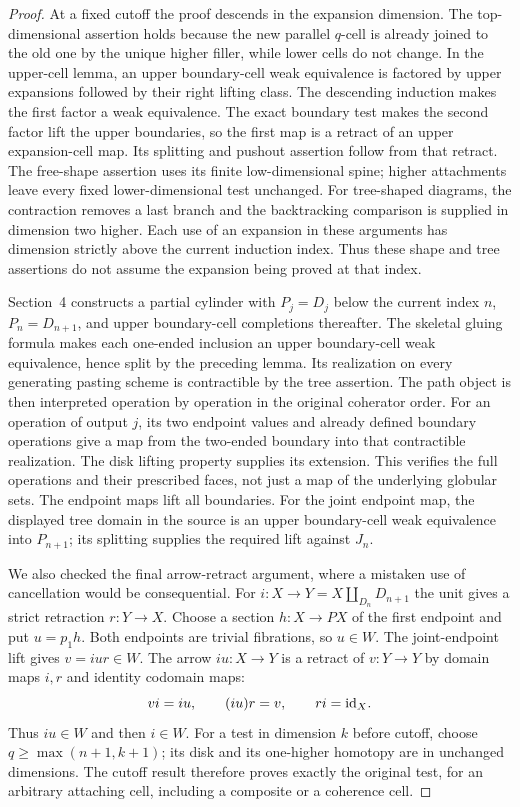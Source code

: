 \begin{proof}
At a fixed cutoff the proof descends in the expansion dimension.
The top-dimensional assertion holds because the new parallel
$q$-cell is already joined to the old one by the unique higher
filler, while lower cells do not change. In the upper-cell lemma,
an upper boundary-cell weak equivalence is factored by upper
expansions followed by their right lifting class. The descending
induction makes the first factor a weak equivalence. The exact
boundary test makes the second factor lift the upper boundaries,
so the first map is a retract of an upper expansion-cell map.
Its splitting and pushout assertion follow from that retract.
The free-shape assertion uses its finite low-dimensional spine;
higher attachments leave every fixed lower-dimensional test
unchanged. For tree-shaped diagrams, the contraction removes a
last branch and the backtracking comparison is supplied in
dimension two higher. Each use of an expansion in these arguments
has dimension strictly above the current induction index. Thus
these shape and tree assertions do not assume the expansion being
proved at that index.

Section~4 constructs a partial cylinder with $P_j=D_j$ below the
current index $n$, $P_n=D_{n+1}$, and upper boundary-cell completions
thereafter. The skeletal gluing formula makes each one-ended
inclusion an upper boundary-cell weak equivalence, hence split by
the preceding lemma. Its realization on every generating pasting
scheme is contractible by the tree assertion. The path object is
then interpreted operation by operation in the original coherator
order. For an operation of output $j$, its two endpoint values and
already defined boundary operations give a map from the
two-ended boundary into that contractible realization. The disk
lifting property supplies its extension. This verifies the full
operations and their prescribed faces, not just a map of the
underlying globular sets. The endpoint maps lift all boundaries.
For the joint endpoint map, the displayed tree domain in the
source is an upper boundary-cell weak equivalence into $P_{n+1}$;
its splitting supplies the required lift against $J_n$.

We also checked the final arrow-retract argument, where a mistaken
use of cancellation would be consequential. For
$i:X\to Y=X\amalg_{D_n}D_{n+1}$ the unit gives a strict
retraction $r:Y\to X$. Choose a section $h:X\to PX$ of the
first endpoint and put $u=p_1h$. Both endpoints are trivial
fibrations, so $u\in W$. The joint-endpoint lift gives
$v=iur\in W$. The arrow $iu:X\to Y$ is a retract of
$v:Y\to Y$ by domain maps $i,r$ and identity codomain maps:
\[
 vi=iu,\qquad (iu)r=v,\qquad ri=\mathrm{id}_X.
\]
Thus $iu\in W$ and then $i\in W$. For a test in dimension $k$
before cutoff, choose $q\geq\max(n+1,k+1)$; its disk and its
one-higher homotopy are in unchanged dimensions. The cutoff result
therefore proves exactly the original test, for an arbitrary
attaching cell, including a composite or a coherence cell.


\end{proof}
